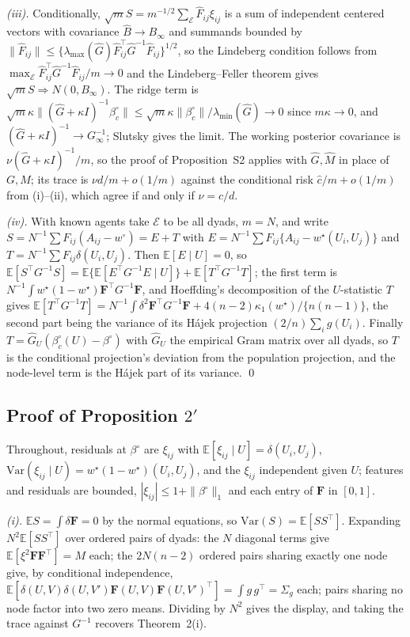 \documentclass[12pt]{article}
\newcommand{\E}{\mathbb{E}}
\newcommand{\calE}{\mathcal{E}}
\newcommand{\norm}[1]{\|#1\|}
\newcommand{\wstar}{w^{\star}}
\newcommand{\wproj}{w^{\circ}}
\newcommand{\bproj}{\beta^{\circ}}
\newcommand{\Fv}{\mathbf{F}}
\newcommand{\Var}{\mathrm{Var}}
\begin{document}
\emph{(iii).} Conditionally, $\sqrt mS=m^{-1/2}\sum_{\calE}\hat F_{ij}\xi_{ij}$ is a sum of independent centered vectors with covariance $\hat B\to B_\infty$ and summands bounded by $\norm{\hat F_{ij}}\le\{\lambda_{\max}(\hat G)\hat F_{ij}^{\top}\hat G^{-1}\hat F_{ij}\}^{1/2}$, so the Lindeberg condition follows from $\max_{\calE}\hat F_{ij}^{\top}\hat G^{-1}\hat F_{ij}/m\to0$ and the Lindeberg--Feller theorem gives $\sqrt mS\Rightarrow N(0,B_\infty)$. The ridge term is $\sqrt m\kappa\norm{(\hat G+\kappa I)^{-1}\beta^{\circ}_{c}}\le\sqrt m\kappa\norm{\beta^{\circ}_{c}}/\lambda_{\min}(\hat G)\to0$ since $m\kappa\to0$, and $(\hat G+\kappa I)^{-1}\to G_\infty^{-1}$; Slutsky gives the limit. The working posterior covariance is $\nu(\hat G+\kappa I)^{-1}/m$, so the proof of Proposition~S2 applies with $\hat G,\hat M$ in place of $G,M$; its trace is $\nu d/m+o(1/m)$ against the conditional risk $\hat c/m+o(1/m)$ from (i)--(ii), which agree if and only if $\nu=\hat c/d$.

\emph{(iv).} With known agents take $\calE$ to be all dyads, $m=N$, and write $S=N^{-1}\sum F_{ij}(A_{ij}-\wproj)=E+T$ with $E=N^{-1}\sum F_{ij}\{A_{ij}-\wstar(U_i,U_j)\}$ and $T=N^{-1}\sum F_{ij}\delta(U_i,U_j)$. Then $\E[E\mid U]=0$, so $\E[S^{\top}G^{-1}S]=\E\{\E[E^{\top}G^{-1}E\mid U]\}+\E[T^{\top}G^{-1}T]$; the first term is $N^{-1}\int\wstar(1-\wstar)\Fv^{\top}G^{-1}\Fv$, and Hoeffding's decomposition of the $U$-statistic $T$ gives $\E[T^{\top}G^{-1}T]=N^{-1}\int\delta^2\Fv^{\top}G^{-1}\Fv+4(n-2)\kappa_1(\wstar)/\{n(n-1)\}$, the second part being the variance of its Hájek projection $(2/n)\sum_ig(U_i)$. Finally $T=\hat G_U(\beta^{\circ}_{c}(U)-\bproj)$ with $\hat G_U$ the empirical Gram matrix over all dyads, so $T$ is the conditional projection's deviation from the population projection, and the node-level term is the Hájek part of its variance. \qed

\subsection*{Proof of Proposition $2'$}

Throughout, residuals at $\bproj$ are $\xi_{ij}$ with $\E[\xi_{ij}\mid U]=\delta(U_i,U_j)$, $\Var(\xi_{ij}\mid U)=\wstar(1-\wstar)(U_i,U_j)$, and the $\xi_{ij}$ independent given $U$; features and residuals are bounded, $|\xi_{ij}|\le1+\norm{\bproj}_1$ and each entry of $\Fv$ in $[0,1]$.

\emph{(i).} $\E S=\int\delta\Fv=0$ by the normal equations, so $\Var(S)=\E[SS^{\top}]$. Expanding $N^2\E[SS^{\top}]$ over ordered pairs of dyads: the $N$ diagonal terms give $\E[\xi^2\Fv\Fv^{\top}]=M$ each; the $2N(n-2)$ ordered pairs sharing exactly one node give, by conditional independence, $\E[\delta(U,V)\delta(U,V')\Fv(U,V)\Fv(U,V')^{\top}]=\int g\,g^{\top}=\Sigma_g$ each; pairs sharing no node factor into two zero means. Dividing by $N^2$ gives the display, and taking the trace against $G^{-1}$ recovers Theorem~2(i).
\end{document}
